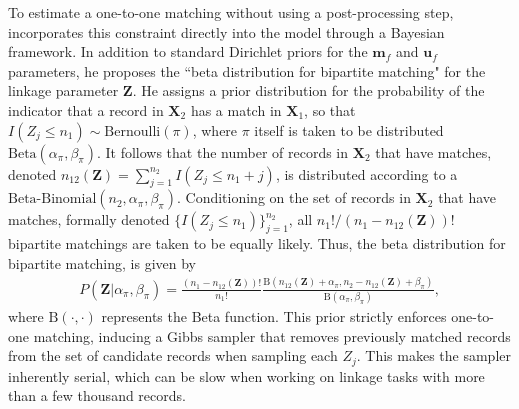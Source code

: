 \documentclass[ba]{imsart}
\begin{document}
To estimate a one-to-one matching without using a post-processing step, \cite{sadinle_bayesian_2017} incorporates this constraint directly into the model through a Bayesian framework. In addition to standard Dirichlet priors for the $\bm{m}_f$ and $\bm{u}_f$ parameters, he proposes the ``beta distribution for bipartite matching" for the linkage parameter $\bm{Z}$. He assigns a prior distribution for the probability of the indicator that a record in $\bm{X}_2$ has a match in $\bm{X}_1$, so that $I(Z_j \leq n_1) \sim \text{Bernoulli}(\pi)$, where $\pi$ itself is taken to be distributed $\text{Beta}(\alpha_{\pi}, \beta_{\pi})$. It follows that the number of records in $\bm{X}_2$ that have matches, denoted $n_{12}(\bm{Z}) = \sum_{j=1}^{n_2} I(Z_j \leq n_1 + j)$, is distributed according to a $\text{Beta-Binomial}(n_2, \alpha_{\pi}, \beta_{\pi})$. Conditioning on the set of records in $\bm{X}_2$ that have matches, formally denoted $\{I(Z_j \leq n_1)\}_{j=1}^{n_2}$, all $n_1 ! / (n_1 - n_{12}(\bm{Z}))!$ bipartite matchings are taken to be equally likely. Thus, the beta distribution for bipartite matching, is given by
\begin{align}
\label{eqn:sadinle_prior}
P(\bm{Z}|\alpha_{\pi}, \beta_{\pi}) = \frac{(n_1 - n_{12}(\bm{Z}))!}{n_1 !}\frac{\text{B}(n_{12}(\bm{Z}) + \alpha_{\pi}, n_2 - n_{12}(\bm{Z}) + \beta_{\pi})}{\text{B}(\alpha_{\pi}, \beta_{\pi})},
\end{align}
where $\text{B}(\cdot, \cdot)$ represents the Beta function. This prior strictly enforces one-to-one matching, inducing a Gibbs sampler that removes previously matched records from the set of candidate records when sampling each \(Z_j\). This makes the sampler inherently serial, which can be slow when working on linkage tasks with more than a few thousand records.
\end{document}
